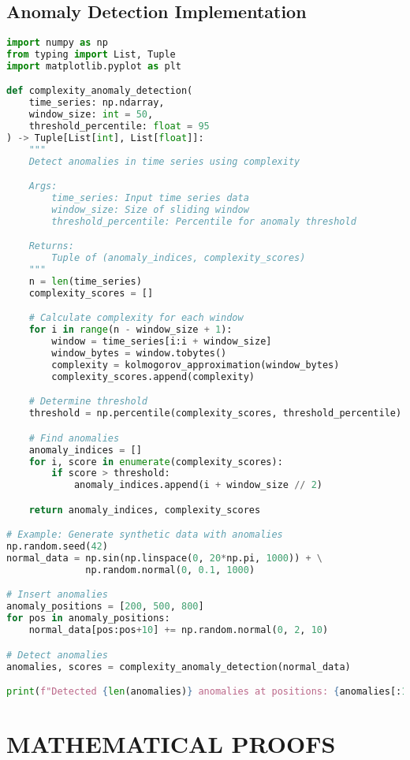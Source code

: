 \documentclass[12pt,a4paper]{report}
\begin{document}
\section{Anomaly Detection Implementation}

\begin{lstlisting}[language=Python, caption=Anomaly Detection using Complexity]
import numpy as np
from typing import List, Tuple
import matplotlib.pyplot as plt

def complexity_anomaly_detection(
    time_series: np.ndarray,
    window_size: int = 50,
    threshold_percentile: float = 95
) -> Tuple[List[int], List[float]]:
    """
    Detect anomalies in time series using complexity

    Args:
        time_series: Input time series data
        window_size: Size of sliding window
        threshold_percentile: Percentile for anomaly threshold

    Returns:
        Tuple of (anomaly_indices, complexity_scores)
    """
    n = len(time_series)
    complexity_scores = []

    # Calculate complexity for each window
    for i in range(n - window_size + 1):
        window = time_series[i:i + window_size]
        window_bytes = window.tobytes()
        complexity = kolmogorov_approximation(window_bytes)
        complexity_scores.append(complexity)

    # Determine threshold
    threshold = np.percentile(complexity_scores, threshold_percentile)

    # Find anomalies
    anomaly_indices = []
    for i, score in enumerate(complexity_scores):
        if score > threshold:
            anomaly_indices.append(i + window_size // 2)

    return anomaly_indices, complexity_scores

# Example: Generate synthetic data with anomalies
np.random.seed(42)
normal_data = np.sin(np.linspace(0, 20*np.pi, 1000)) + \
              np.random.normal(0, 0.1, 1000)

# Insert anomalies
anomaly_positions = [200, 500, 800]
for pos in anomaly_positions:
    normal_data[pos:pos+10] += np.random.normal(0, 2, 10)

# Detect anomalies
anomalies, scores = complexity_anomaly_detection(normal_data)

print(f"Detected {len(anomalies)} anomalies at positions: {anomalies[:10]}")
\end{lstlisting}

\chapter{MATHEMATICAL PROOFS}
\end{document}
